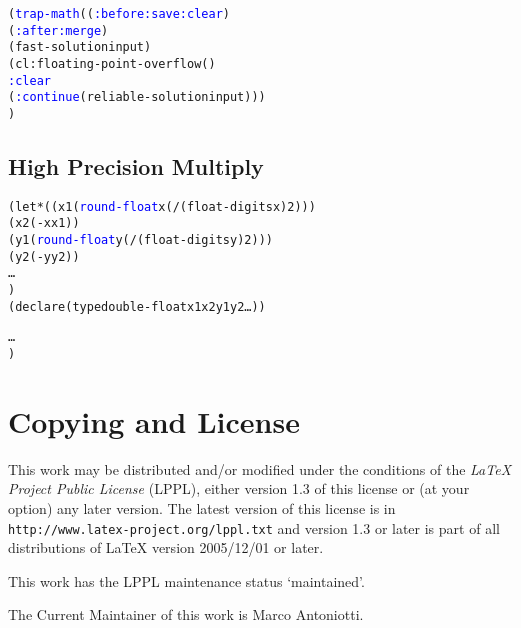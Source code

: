\documentclass[10pt,fleqn]{article}
\newcommand{\codelia}[1]{\textcolor{blue}{#1}}
\begin{document}
\begin{alltt}
    (\codelia{trap-math} ((\codelia{:before :save :clear})
                (\codelia{:after :merge})
      (fast-solution input)
      (cl:floating-point-overflow ()
         \codelia{:clear}
         (\codelia{:continue} (reliable-solution input)))
      )
\end{alltt}


\subsection{High Precision Multiply}

\begin{alltt}
    (let* ((x1 (\codelia{round-float} x (/ (float-digits x) 2)))
           (x2 (- x x1))
           (y1 (\codelia{round-float} y (/ (float-digits y) 2)))
           (y2 (- y y2))
           \ldots
           )
      (declare (type double-float x1 x2 y1 y2 \ldots))

      \ldots
      )
\end{alltt}

\section{Copying and License}

This work may be distributed and/or modified under the conditions of
the \emph{LaTeX Project Public License} (LPPL), either version 1.3 of
this license or (at your option) any later version. The latest version
of this license is in \texttt{http://www.latex-project.org/lppl.txt}
and version 1.3 or later is part of all distributions of LaTeX version
2005/12/01 or later.

\noindent
This work has the LPPL maintenance status `maintained'.

\noindent
The Current Maintainer of this work is Marco Antoniotti.

\printindex
\end{document}
